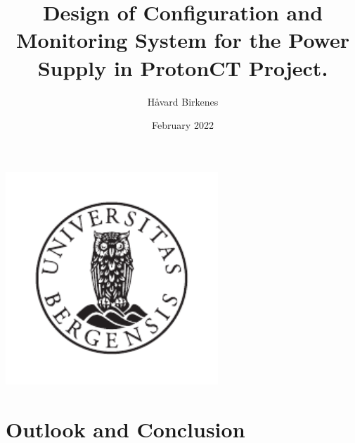 \documentclass[12pt]{article}
\title{Design of Configuration and Monitoring System for the Power Supply in ProtonCT Project.}
\author{Håvard Birkenes}
\date{February 2022}
\begin{document}
\renewcommand{\notinmain}[1]{}
    \maketitle
    \thispagestyle{empty}
    \begin{center}
        \includegraphics[width=8cm]{images/UiB-emblem_gray.pdf}
    \end{center}


    \newpage
    \tableofcontents
    \newpage
    \printglossary
    \printglossary[type=\acronymtype]
    \newpage
    
    \newpage






    
\newpage
    
\newpage
    
\newpage
    
\newpage
    
\newpage

    
\newpage

\newpage
\section{Outlook and Conclusion}


\newpage


\newpage


\end{document}
